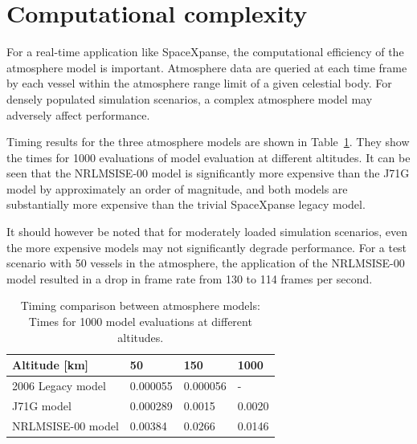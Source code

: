 \documentclass[a4paper]{article}
\begin{document}
\section {Computational complexity}
For a real-time application like SpaceXpanse, the computational efficiency of the atmosphere model is important. Atmosphere data are queried at each time frame by each vessel within the atmosphere range limit of a given celestial body. For densely populated simulation scenarios, a complex atmosphere model may adversely affect performance.

Timing results for the three atmosphere models are shown in Table~\ref{tab:timing}. They show the times for 1000 evaluations of model evaluation at different altitudes. It can be seen that the NRLMSISE-00 model is significantly more expensive than the J71G model by approximately an order of magnitude, and both models are substantially more expensive than the trivial SpaceXpanse legacy model.

It should however be noted that for moderately loaded simulation scenarios, even the more expensive models may not significantly degrade performance. For a test scenario with 50 vessels in the atmosphere, the application of the NRLMSISE-00 model resulted in a drop in frame rate from 130 to 114 frames per second.
\begin{table}
\begin{tabular}{l|lll}
Altitude [km] & 50 & 150 & 1000 \\ \hline
2006 Legacy model & 0.000055 & 0.000056 & - \\
J71G model & 0.000289 & 0.0015 & 0.0020 \\
NRLMSISE-00 model & 0.00384 & 0.0266 & 0.0146
\end{tabular}
\caption{Timing comparison between atmosphere models: Times for 1000 model evaluations at different altitudes.}
\label{tab:timing}
\end{table}


\end{document}

